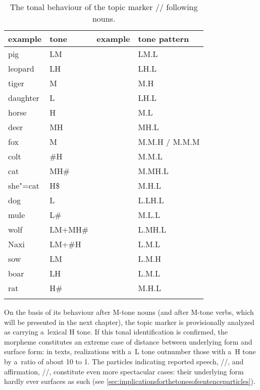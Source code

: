 \begin{table}%
\caption{\label{tab:thetonalbehaviourofthetopicmarkerfollowingnouns}The tonal behaviour of the topic marker // following nouns.}
\begin{tabularx}{\textwidth}{ Q Q l l }
\lsptoprule
	example & tone & example & tone pattern\\ \midrule
	pig & LM &  & LM.L\\
	leopard & LH &  & LH.L\\
	tiger & M &  & M.H\\
	daughter & L &  & LH.L\\
	horse & H &  & M.L\\
	deer & MH &  & MH.L\\ \addlinespace \hdashline \addlinespace
	fox & M &  & M.M.H / M.M.M\\
	colt & \#H &  & M.M.L\\
	cat & MH\# &  & M.MH.L\\
	she"=cat & H\$ &  & M.H.L\\
	dog & L &  & L.LH.L\\
	mule & L\# &  & M.L.L\\
	wolf & LM+MH\# &  & L.MH.L\\
	Naxi & LM+\#H &  & L.M.L\\
	sow & LM &  & L.M.H\\
	boar & LH &  & L.M.L\\
	rat & H\# &  & M.H.L\\
\lspbottomrule
\end{tabularx}
\end{table}

On the basis of its behaviour after M-tone nouns (and after M-tone verbs, which will be presented in the next chapter), the topic marker is provisionally analyzed as carrying a~lexical H tone. If this tonal identification is confirmed, the morpheme constitutes an extreme case of distance between underlying form and surface form: in texts, realizations with a~L tone outnumber those with a~H tone by a~ratio of about 10 to 1. The particles indicating reported speech, //, and affirmation, //, constitute even more spectacular cases: their underlying form hardly ever surfaces as such (see \ref{sec:implicationsforthetonesofsentenceparticles}).

